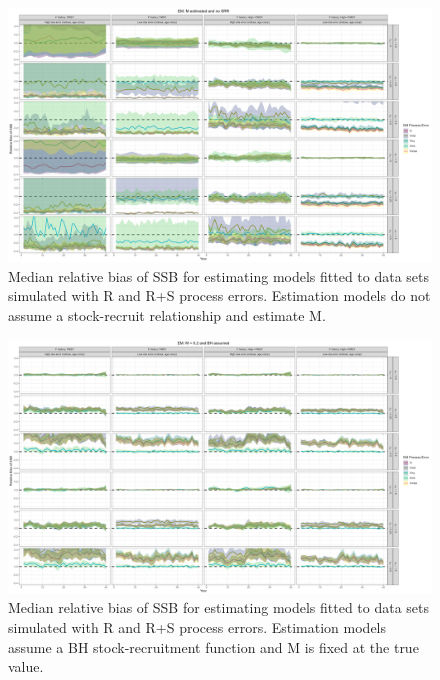 \documentclass[
  12pt,
]{article}
\begin{document}
\begin{landscape}
\begin{figure}
\caption{Median relative bias of SSB for estimating models fitted to data sets simulated with R and R+S process errors. Estimation models do not assume a stock-recruit relationship and estimate M.}\label{naa_om_em_R_ME_relbias_ssb}
\begin{center}
\includegraphics[width = \textwidth]{naa_om_R_ME_relbias_ssb.png}
\end{center}
\end{figure}
\end{landscape}

\begin{landscape}
\begin{figure}
\caption{Median relative bias of SSB for estimating models fitted to data sets simulated with R and R+S process errors. Estimation models assume a BH stock-recruitment function and M is fixed at the true value.}\label{naa_om_em_BH_MF_relbias_ssb}
\begin{center}
\includegraphics[width = \textwidth]{naa_om_BH_MF_relbias_ssb.png}
\end{center}
\end{figure}
\end{landscape}
\end{document}
